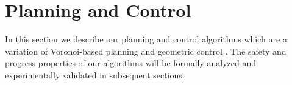 \section{Planning and Control}
\label{sec:percp-plan-control}

In this section we describe our planning and control algorithms which are a variation of  Voronoi-based planning \cite{Das.2011} and geometric control \cite{Snider.2009}.
The safety and progress properties of our algorithms will be formally analyzed and experimentally validated in subsequent sections. 




